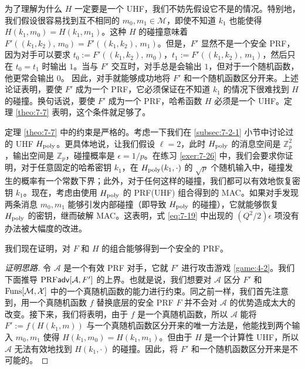 为了理解为什么 $H$ 一定要是一个 UHF，我们不妨先假设它不是的情况。特别地，我们假设很容易找到互不相同的 $m_0,m_1\in\mathcal{M}$，即使不知道 $k_1$ 也能使得 $H(k_1,m_0)=H(k_1,m_1)$。这种 $H$ 的碰撞意味着$F'((k_1,k_2),\,m_0)=F'((k_1,k_2),\,m_1)$。但是，$F'$ 显然不是一个安全 PRF，因为对手可以要求 $t_0:=F'((k_1,k_2),\,m_0)$，$t_1:=F'((k_1,k_2),\,m_1)$，然后只在 $t_0=t_1$ 时输出 $1$。当与 $F'$ 交互时，对手总是会输出 $1$，但对于一个随机函数，他更常会输出 $0$。 因此，对手就能够成功地将 $F'$ 和一个随机函数区分开来。上述论证表明，要使 $F'$ 成为一个 PRF，它必须保证在不知道 $k_1$ 的情况下很难找到 $H$ 的碰撞。换句话说，要使 $F'$ 成为一个 PRF，哈希函数 $H$ 必须是一个 UHF。定理 \ref{theo:7-7} 表明，这个条件就足够了。

\begin{remark}\label{remark:7-2}
定理 \ref{theo:7-7} 中的约束是严格的。考虑一下我们在 \ref{subsec:7-2-1} 小节中讨论过的 UHF $H_{\rm poly}$。更具体地说，让我们假设 $\ell=2$，此时 $H_{\rm poly}$ 的消息空间是 $\mathbb{Z}^2_p$，输出空间是 $\mathbb{Z}_p$，碰撞概率是 $\epsilon={1}/{p}$。在练习 \ref{exer:7-26} 中，我们会要求你证明，对于任意固定的哈希密钥 $k_1$，在 $H_{\rm poly}(k_1,\cdot)$ 的 $\sqrt{p}$ 个随机输入中，碰撞发生的概率有一个常数下界；此外，对于任何这样的碰撞，我们都可以有效地恢复密钥 $k_1$。现在，考虑由使用 $H_{\rm poly}$ 的 PRF(UHF) 组合得到的 MAC。如果对手发现两条消息 $m_0,m_1$ 能够引发内部碰撞（即导致 $H_{\rm poly}$ 的碰撞），它就能够恢复 $H_{\rm poly}$ 的密钥，继而破解 MAC。这表明，式 \ref{eq:7-19} 中出现的 ${(Q^2/2)\epsilon}$ 项没有办法被大幅度的改进。
\end{remark}

\begin{snote}
我们现在证明，对 $F$ 和 $H$ 的组合能够得到一个安全的 PRF。
\end{snote}

\begin{proof}[证明思路]
令 $\mathcal{A}$ 是一个有效 PRF 对手，它就 $F'$ 进行攻击游戏 \ref{game:4-2}。我们下面推导 ${\rm PRF}\mathsf{adv}[\mathcal{A},F']$ 的上界。也就是说，我们想要对 $\mathcal{A}$ 区分 $F'$ 和 ${\rm Funs}[\mathcal{M},\mathcal{X}]$ 中的一个真随机函数的能力进行约束。同之前一样，我们首先注意到，用一个真随机函数 $f$ 替换底层的安全 PRF $F$ 并不会对 $\mathcal{A}$ 的优势造成太大的改变。接下来，我们将表明，由于 $f$ 是一个真随机函数，所以 $\mathcal{A}$ 能将 $F':=f(H(k_1,m))$ 与一个真随机函数区分开来的唯一方法是，他能找到两个输入 $m_0,m_1$ 使得 $H(k_1,m_0)=H(k_1,m_1)$。但由于 $H$ 是一个计算性 UHF，所以 $\mathcal{A}$ 无法有效地找到 $H(k_1,\cdot)$ 的碰撞。因此，将 $F'$ 和一个随机函数区分开来是不可能的。
\end{proof}

